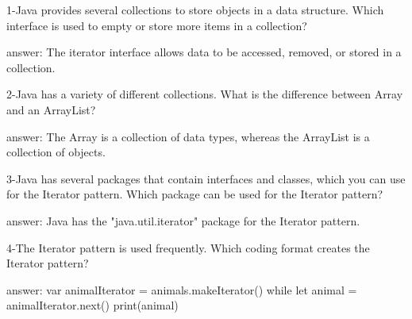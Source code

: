 1-Java provides several collections to store objects in a data structure. Which interface is used to empty or store more items in a collection?

answer: The iterator interface allows data to be accessed, removed, or stored in a collection.

2-Java has a variety of different collections. What is the difference between Array and an ArrayList?

answer: The Array is a collection of data types, whereas the ArrayList is a collection of objects.

3-Java has several packages that contain interfaces and classes, which you can use for the Iterator pattern. Which package can be used for the Iterator pattern?

answer: Java has the "java.util.iterator" package for the Iterator pattern.

4-The Iterator pattern is used frequently. Which coding format creates the Iterator pattern?

answer: 
var animalIterator = animals.makeIterator()
while let animal = animalIterator.next() {
     print(animal)
}

